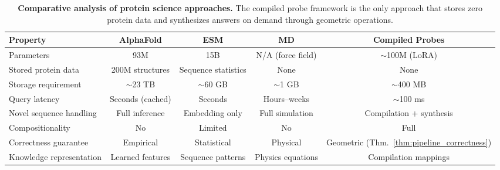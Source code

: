 \documentclass[11pt,twocolumn,a4paper]{article}
\theoremstyle{definition}
\theoremstyle{remark}
\begin{document}
\begin{table}[!htbp]
\centering
\caption{\textbf{Comparative analysis of protein science approaches.} The compiled probe framework is the only approach that stores zero protein data and synthesizes answers on demand through geometric operations.}
\label{tab:comparison}
\begin{tabular}{@{}lcccc@{}}
\toprule
\textbf{Property} & \textbf{AlphaFold} & \textbf{ESM} & \textbf{MD} & \textbf{Compiled Probes} \\
\midrule
Parameters & 93M & 15B & N/A (force field) & $\sim$100M (LoRA) \\
Stored protein data & 200M structures & Sequence statistics & None & None \\
Storage requirement & $\sim$23 TB & $\sim$60 GB & $\sim$1 GB & $\sim$400 MB \\
Query latency & Seconds (cached) & Seconds & Hours--weeks & $\sim$100 ms \\
Novel sequence handling & Full inference & Embedding only & Full simulation & Compilation + synthesis \\
Compositionality & No & Limited & No & Full \\
Correctness guarantee & Empirical & Statistical & Physical & Geometric (Thm.~\ref{thm:pipeline_correctness}) \\
Knowledge representation & Learned features & Sequence patterns & Physics equations & Compilation mappings \\
\bottomrule
\end{tabular}
\end{table}
\end{document}
